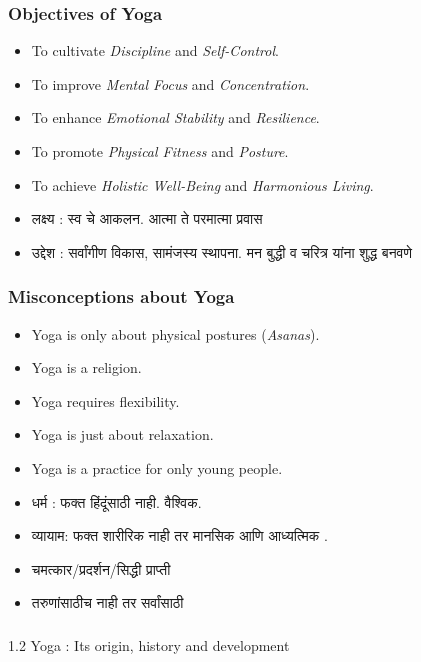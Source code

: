 \begin{frame}[fragile]\frametitle{Objectives of Yoga}

      \begin{itemize}
		\item To cultivate \textit{Discipline} and \textit{Self-Control}.
		\item To improve \textit{Mental Focus} and \textit{Concentration}.
		\item To enhance \textit{Emotional Stability} and \textit{Resilience}.
		\item To promote \textit{Physical Fitness} and \textit{Posture}.
		\item To achieve \textit{Holistic Well-Being} and \textit{Harmonious Living}.
		\item लक्ष्य : स्व चे आकलन. आत्मा ते परमात्मा प्रवास 
		\item उद्देश : सर्वांगीण विकास, सामंजस्य स्थापना. मन बुद्धी व चरित्र यांना शुद्ध बनवणे		
	  \end{itemize}

\end{frame}

\begin{frame}[fragile]\frametitle{Misconceptions about Yoga}

      \begin{itemize}
		\item Yoga is only about physical postures (\textit{Asanas}).
		\item Yoga is a religion.
		\item Yoga requires flexibility.
		\item Yoga is just about relaxation.
		\item Yoga is a practice for only young people.
		\item  धर्म : फक्त हिंदूंसाठी नाही. वैश्विक. 
		\item  व्यायाम: फक्त शारीरिक नाही तर मानसिक आणि आध्यत्मिक . 
		\item  चमत्कार/प्रदर्शन/सिद्धी प्राप्ती 
		\item  तरुणांसाठीच नाही  तर सर्वांसाठी 
		
	  \end{itemize}

\end{frame}


\begin{frame}[fragile]\frametitle{}
\begin{center}
{\Large 1.2 Yoga : Its origin, history and development}
\end{center}
\end{frame}



